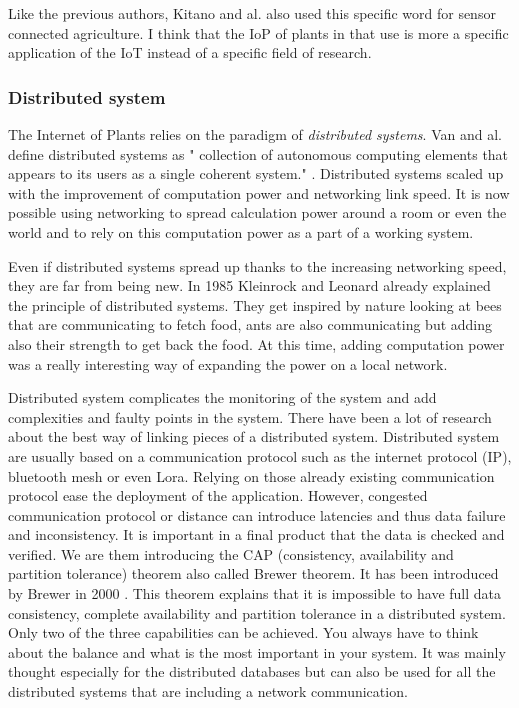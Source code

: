 Like the previous authors, Kitano and al. \cite{kitanoInternetPlantsIoP2022} also used this specific word for sensor connected agriculture. I think that the IoP of plants in that use is more a specific application of the IoT instead of a specific field of research.

\subsubsection{Distributed system}

The Internet of Plants relies on the paradigm of \textit{distributed systems}. Van and al. define distributed systems as " collection of autonomous computing elements that appears to its users as a single coherent system." \cite{steenDistributedSystems2017}.
Distributed systems scaled up with the improvement of computation power and networking link speed. It is now possible using networking to spread calculation power around a room or even the world and to rely on this computation power as a part of a working system.

Even if distributed systems spread up thanks to the increasing networking speed, they are far from being new. In 1985 Kleinrock and Leonard \cite{kleinrockDistributedSystems} already explained the principle of distributed systems. They get inspired by nature looking at bees that are communicating to fetch food, ants are also communicating but adding also their strength to get back the food.
At this time, adding computation power was a really interesting way of expanding the power on a local network.

Distributed system complicates the monitoring of the system and add complexities and faulty points in the system. There have been a lot of
research about the best way of linking pieces of a distributed system. Distributed system are usually based on a communication protocol such as the internet protocol (IP), bluetooth mesh or even Lora.
Relying on those already existing communication protocol ease the deployment of the application.
However, congested communication protocol or distance can introduce latencies and thus data failure and inconsistency.
It is important in a final product that the data is checked and verified.
We are them introducing the CAP (consistency, availability and partition tolerance) theorem also called Brewer theorem.
It has been introduced by Brewer in 2000 \cite{brewerRobustDistributedSystems2000}.
This theorem explains that it is impossible to have full data consistency, complete availability and partition tolerance
in a distributed system. Only two of the three capabilities can be achieved.
You always have to think about the balance and what is the most important in your system.
It was mainly thought especially for the distributed databases but can also be used for all the distributed systems that are
including a network communication.

